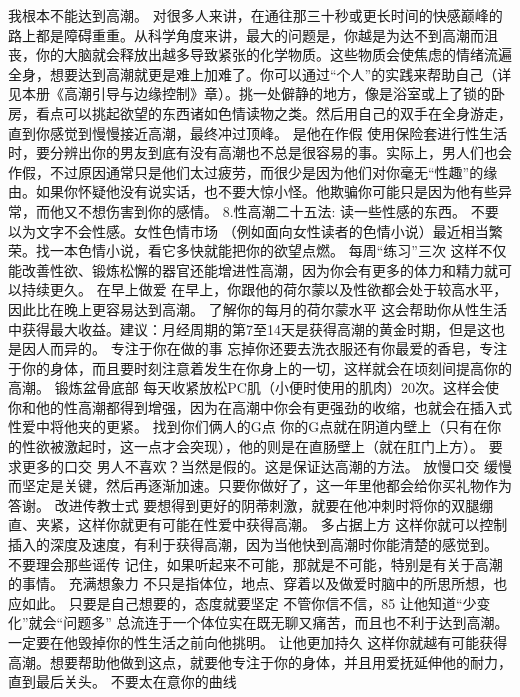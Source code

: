 \documentclass[12pt,UTF8,openany]{ctexbook}
\begin{document}
我根本不能达到高潮。
对很多人来讲，在通往那三十秒或更长时间的快感巅峰的路上都是障碍重重。从科学角度来讲，最大的问题是，你越是为达不到高潮而沮丧，你的大脑就会释放出越多导致紧张的化学物质。这些物质会使焦虑的情绪流遍全身，想要达到高潮就更是难上加难了。你可以通过“个人”的实践来帮助自己（详见本册《高潮引导与边缘控制》章）。挑一处僻静的地方，像是浴室或上了锁的卧房，看点可以挑起欲望的东西诸如色情读物之类。然后用自己的双手在全身游走，直到你感觉到慢慢接近高潮，最终冲过顶峰。
是他在作假
使用保险套进行性生活时，要分辨出你的男友到底有没有高潮也不总是很容易的事。实际上，男人们也会作假，不过原因通常只是他们太过疲劳，而很少是因为他们对你毫无“性趣”的缘由。如果你怀疑他没有说实话，也不要大惊小怪。他欺骗你可能只是因为他有些异常，而他又不想伤害到你的感情。
8.性高潮二十五法:
读一些性感的东西。
不要以为文字不会性感。女性色情市场 （例如面向女性读者的色情小说）最近相当繁荣。找一本色情小说，看它多快就能把你的欲望点燃。
每周“练习”三次
这样不仅能改善性欲、锻炼松懈的器官还能增进性高潮，因为你会有更多的体力和精力就可以持续更久。
在早上做爱
在早上，你跟他的荷尔蒙以及性欲都会处于较高水平，因此比在晚上更容易达到高潮。
了解你的每月的荷尔蒙水平
这会帮助你从性生活中获得最大收益。建议：月经周期的第7至14天是获得高潮的黄金时期，但是这也是因人而异的。
专注于你在做的事
忘掉你还要去洗衣服还有你最爱的香皂，专注于你的身体，而且要时刻注意着发生在你身上的一切，这样就会在顷刻间提高你的高潮。
锻炼盆骨底部
每天收紧放松PC肌（小便时使用的肌肉）20次。这样会使你和他的性高潮都得到增强，因为在高潮中你会有更强劲的收缩，也就会在插入式性爱中将他夹的更紧。
找到你们俩人的G点
你的G点就在阴道内壁上（只有在你的性欲被激起时，这一点才会突现），他的则是在直肠壁上（就在肛门上方）。
要求更多的口交
男人不喜欢？当然是假的。这是保证达高潮的方法。
放慢口交
缓慢而坚定是关键，然后再逐渐加速。只要你做好了，这一年里他都会给你买礼物作为答谢。
改进传教士式
要想得到更好的阴蒂刺激，就要在他冲刺时将你的双腿绷直、夹紧，这样你就更有可能在性爱中获得高潮。
多占据上方
这样你就可以控制插入的深度及速度，有利于获得高潮，因为当他快到高潮时你能清楚的感觉到。
不要理会那些谣传
记住，如果听起来不可能，那就是不可能，特别是有关于高潮的事情。
充满想象力
不只是指体位，地点、穿着以及做爱时脑中的所思所想，也应如此。
只要是自己想要的，态度就要坚定
不管你信不信，85%
让他知道“少变化”就会“问题多”
总流连于一个体位实在既无聊又痛苦，而且也不利于达到高潮。一定要在他毁掉你的性生活之前向他挑明。
让他更加持久
这样你就越有可能获得高潮。想要帮助他做到这点，就要他专注于你的身体，并且用爱抚延伸他的耐力，直到最后关头。
不要太在意你的曲线
\end{document}
